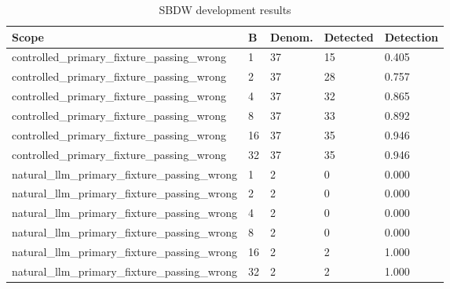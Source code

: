 \begin{table}[t]
\centering
\small
\begin{tabular}{lllll}
\toprule
Scope & B & Denom. & Detected & Detection \\
\midrule
controlled\_primary\_fixture\_passing\_wrong & 1 & 37 & 15 & 0.405 \\
controlled\_primary\_fixture\_passing\_wrong & 2 & 37 & 28 & 0.757 \\
controlled\_primary\_fixture\_passing\_wrong & 4 & 37 & 32 & 0.865 \\
controlled\_primary\_fixture\_passing\_wrong & 8 & 37 & 33 & 0.892 \\
controlled\_primary\_fixture\_passing\_wrong & 16 & 37 & 35 & 0.946 \\
controlled\_primary\_fixture\_passing\_wrong & 32 & 37 & 35 & 0.946 \\
natural\_llm\_primary\_fixture\_passing\_wrong & 1 & 2 & 0 & 0.000 \\
natural\_llm\_primary\_fixture\_passing\_wrong & 2 & 2 & 0 & 0.000 \\
natural\_llm\_primary\_fixture\_passing\_wrong & 4 & 2 & 0 & 0.000 \\
natural\_llm\_primary\_fixture\_passing\_wrong & 8 & 2 & 0 & 0.000 \\
natural\_llm\_primary\_fixture\_passing\_wrong & 16 & 2 & 2 & 1.000 \\
natural\_llm\_primary\_fixture\_passing\_wrong & 32 & 2 & 2 & 1.000 \\
\bottomrule
\end{tabular}
\caption{SBDW development results}
\end{table}
